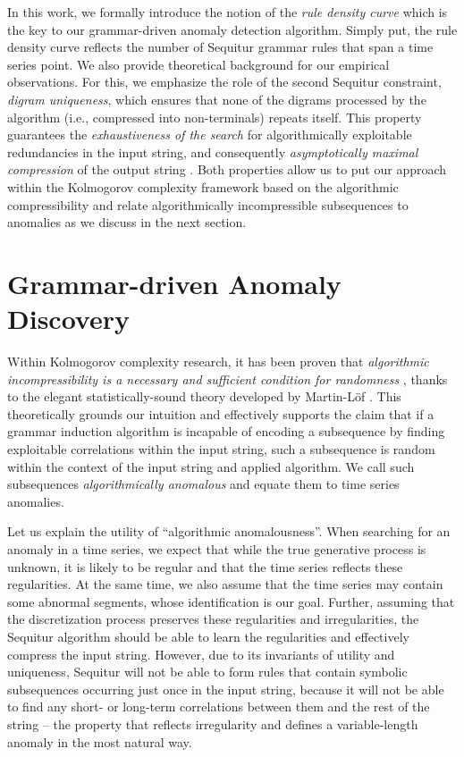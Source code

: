 \documentclass{sig-alternate}
\begin{document}
In this work, we formally introduce the notion of the \textit{rule density curve} which is the key to our grammar-driven anomaly detection algorithm. Simply put, the rule density curve reflects the number of Sequitur grammar rules that span a time series point. We also provide theoretical background for our empirical observations. For this, we emphasize the role of the second Sequitur constraint, \textit{digram uniqueness}, which ensures that none of the digrams processed by the algorithm (i.e., compressed into non-terminals) repeats itself.  This property guarantees the \textit{exhaustiveness of the search} for algorithmically exploitable redundancies in the input string, and consequently \textit{asymptotically maximal compression} of the output string \cite{compression}. Both properties allow us to put our approach within the Kolmogorov complexity framework based on the  algorithmic compressibility and relate algorithmically incompressible subsequences to anomalies as we discuss in the next section.

\section{Grammar-driven Anomaly\\ Discovery}\label{algorithms}
Within Kolmogorov complexity research, it has been proven that \textit{algorithmic incompressibility is a necessary and sufficient condition for randomness} \cite{grigorieff, li_vitanyi}, thanks to the elegant statistically-sound theory developed by Martin-L\"{o}f \cite{per_lof}. This theoretically grounds our intuition and effectively supports the claim that if a grammar induction algorithm is incapable of encoding a subsequence by finding exploitable correlations within the input string, such a subsequence is random within the context of the input string and applied algorithm. We call such subsequences \textit{algorithmically anomalous} and equate them to time series anomalies.  

Let us explain the utility of ``algorithmic anomalousness''. When searching for an anomaly in a time series, we expect that while the true generative process is unknown, it is likely to be regular and that the time series reflects these regularities. At the same time, we also assume that the time series may contain some abnormal segments, whose identification is our goal. Further, assuming that the discretization process preserves these regularities and irregularities, the Sequitur algorithm should be able to learn the regularities and effectively compress the input string. However, due to its invariants of utility and uniqueness, Sequitur will not be able to form rules that contain symbolic subsequences occurring just once in the input string, because it will not be able to find any short- or long-term correlations between them and the rest of the string -- the property that reflects irregularity and defines a variable-length anomaly in the most natural way. %
\end{document}

